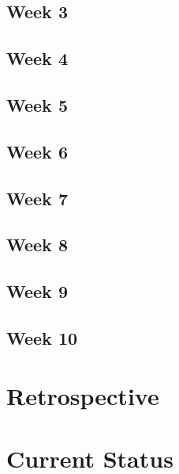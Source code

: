 \documentclass[10pt,journal,compsoc,onecolumn, draftclsnofoot]{IEEEtran}
\begin{document}
\subsection{Week 3}
\subsection{Week 4}
\subsection{Week 5}
\subsection{Week 6}
\subsection{Week 7}
\subsection{Week 8}
\subsection{Week 9}
\subsection{Week 10}

\section{Retrospective}

\section{Current Status}







%
%
\end{document}
